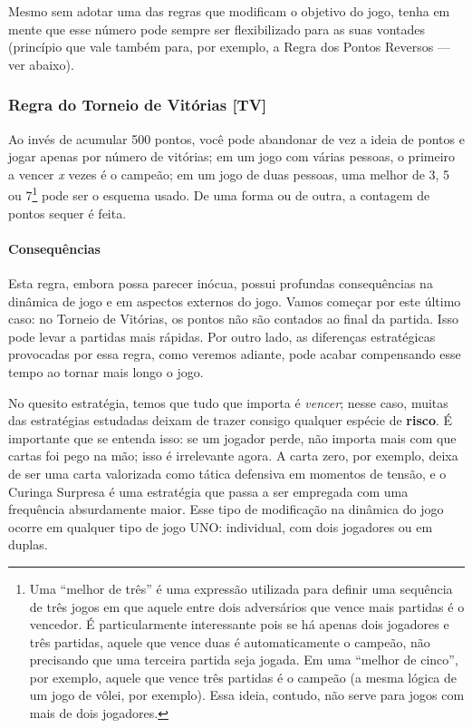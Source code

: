 Mesmo sem adotar uma das regras que modificam o objetivo do jogo, tenha em mente que esse número pode sempre ser flexibilizado para as suas vontades (princípio que vale também para, por exemplo, a Regra dos Pontos Reversos --- ver abaixo). 

\subsubsection{Regra do Torneio de Vitórias [TV]}

Ao invés de acumular 500 pontos, você pode abandonar de vez a ideia de pontos e jogar apenas por número de vitórias; em um jogo com várias pessoas, o primeiro a vencer \textit{x} vezes é o campeão; em um jogo de duas pessoas, uma melhor de 3, 5 ou 7\footnote{Uma ``melhor de três'' é uma expressão utilizada para definir uma sequência de três jogos em que aquele entre dois adversários que vence mais partidas é o vencedor. É particularmente interessante pois se há apenas dois jogadores e três partidas, aquele que vence duas é automaticamente o campeão, não precisando que uma terceira partida seja jogada. Em uma ``melhor de cinco'', por exemplo, aquele que vence três partidas é o campeão (a mesma lógica de um jogo de vôlei, por exemplo). Essa ideia, contudo, não serve para jogos com mais de dois jogadores.} pode ser o esquema usado. De uma forma ou de outra, a contagem de pontos sequer é feita.

\paragraph{Consequências}

Esta regra, embora possa parecer inócua, possui profundas consequências na dinâmica de jogo e em aspectos externos do jogo. Vamos começar por este último caso: no Torneio de Vitórias, os pontos não são contados ao final da partida. Isso pode levar a partidas mais rápidas. Por outro lado, as diferenças estratégicas provocadas por essa regra, como veremos adiante, pode acabar compensando esse tempo ao tornar mais longo o jogo.

No quesito estratégia, temos que tudo que importa é \textit{vencer}; nesse caso, muitas das estratégias estudadas deixam de trazer consigo qualquer espécie de \textbf{risco}. É importante que se entenda isso: se um jogador perde, não importa mais com que cartas foi pego na mão; isso é irrelevante agora. A carta zero, por exemplo, deixa de ser uma carta valorizada como tática defensiva em momentos de tensão, e o Curinga Surpresa é uma estratégia que passa a ser empregada com uma frequência absurdamente maior. Esse tipo de modificação na dinâmica do jogo ocorre em qualquer tipo de jogo UNO: individual, com dois jogadores ou em duplas.

